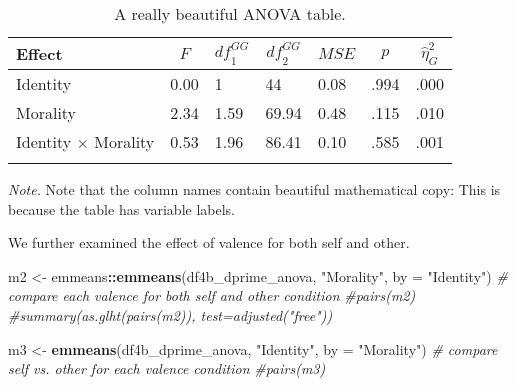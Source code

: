 \documentclass[man]{apa6}
\newenvironment{Shaded}{\begin{snugshade}}{\end{snugshade}}
\newcommand{\CommentTok}[1]{\textcolor[rgb]{0.56,0.35,0.01}{\textit{#1}}}
\newcommand{\DataTypeTok}[1]{\textcolor[rgb]{0.13,0.29,0.53}{#1}}
\newcommand{\KeywordTok}[1]{\textcolor[rgb]{0.13,0.29,0.53}{\textbf{#1}}}
\newcommand{\NormalTok}[1]{#1}
\newcommand{\OperatorTok}[1]{\textcolor[rgb]{0.81,0.36,0.00}{\textbf{#1}}}
\newcommand{\StringTok}[1]{\textcolor[rgb]{0.31,0.60,0.02}{#1}}
\begin{document}
\begin{Shaded}
\end{Shaded}

\begin{table}[tbp]
\begin{center}
\begin{threeparttable}
\caption{\label{tab:unnamed-chunk-8}A really beautiful ANOVA table.}
\begin{tabular}{lllllll}
\toprule
Effect & \multicolumn{1}{c}{$F$} & \multicolumn{1}{c}{$\mathit{df}_1^{GG}$} & \multicolumn{1}{c}{$\mathit{df}_2^{GG}$} & \multicolumn{1}{c}{$\mathit{MSE}$} & \multicolumn{1}{c}{$p$} & \multicolumn{1}{c}{$\hat{\eta}^2_G$}\\
\midrule
Identity & 0.00 & 1 & 44 & 0.08 & .994 & .000\\
Morality & 2.34 & 1.59 & 69.94 & 0.48 & .115 & .010\\
Identity $\times$ Morality & 0.53 & 1.96 & 86.41 & 0.10 & .585 & .001\\
\bottomrule
\addlinespace
\end{tabular}
\begin{tablenotes}[para]
\normalsize{\textit{Note.} Note that the column names contain beautiful mathematical copy: This is because the table has variable labels.}
\end{tablenotes}
\end{threeparttable}
\end{center}
\end{table}

We further examined the effect of valence for both self and other.

\begin{Shaded}
\begin{Highlighting}[]
\NormalTok{m2 <-}\StringTok{ }\NormalTok{emmeans}\OperatorTok{::}\KeywordTok{emmeans}\NormalTok{(df4b_dprime_anova, }\StringTok{"Morality"}\NormalTok{, }\DataTypeTok{by =} \StringTok{"Identity"}\NormalTok{) }\CommentTok{# compare each valence for both self and other condition}
\CommentTok{#pairs(m2)}
\CommentTok{#summary(as.glht(pairs(m2)), test=adjusted("free"))}

\NormalTok{m3 <-}\StringTok{ }\KeywordTok{emmeans}\NormalTok{(df4b_dprime_anova, }\StringTok{"Identity"}\NormalTok{, }\DataTypeTok{by =} \StringTok{"Morality"}\NormalTok{) }\CommentTok{# compare self vs. other for each valence condition}
\CommentTok{#pairs(m3)}
\end{Highlighting}
\end{Shaded}
\end{document}
